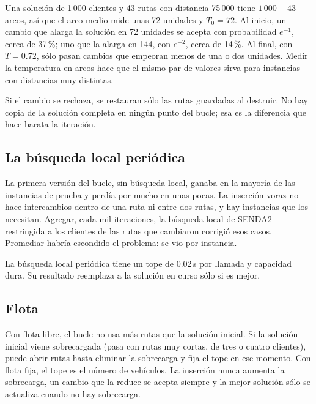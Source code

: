 \documentclass[11pt,a4paper]{article}
\newcommand{\sendados}{SENDA2}
\begin{document}
\begin{ejemplo}
Una solución de 1\,000 clientes y 43 rutas con distancia 75\,000 tiene $1\,000 + 43$ arcos, así que el
arco medio mide unas 72 unidades y $T_0 = 72$. Al inicio, un cambio que alarga la solución en 72
unidades se acepta con probabilidad $e^{-1}$, cerca de 37\,\%; uno que la alarga en 144, con
$e^{-2}$, cerca de 14\,\%. Al final, con $T = 0.72$, sólo pasan cambios que empeoran menos de una o dos
unidades. Medir la temperatura en arcos hace que el mismo par de valores sirva para instancias con
distancias muy distintas.
\end{ejemplo}

Si el cambio se rechaza, se restauran sólo las rutas guardadas al destruir. No hay copia de la solución
completa en ningún punto del bucle; esa es la diferencia que hace barata la iteración.

\subsection{La búsqueda local periódica}

\begin{leccion}
La primera versión del bucle, sin búsqueda local, ganaba en la mayoría de las instancias de prueba y
perdía por mucho en unas pocas. La inserción voraz no hace intercambios dentro de una ruta ni entre dos
rutas, y hay instancias que los necesitan. Agregar, cada mil iteraciones, la búsqueda local de
\sendados{} restringida a los clientes de las rutas que cambiaron corrigió esos casos. Promediar habría
escondido el problema: se vio por instancia.
\end{leccion}

La búsqueda local periódica tiene un tope de 0.02\,s por llamada y capacidad dura. Su resultado
reemplaza a la solución en curso sólo si es mejor.

\subsection{Flota}

Con flota libre, el bucle no usa más rutas que la solución inicial. Si la solución inicial viene
sobrecargada (pasa con rutas muy cortas, de tres o cuatro clientes), puede abrir rutas hasta eliminar
la sobrecarga y fija el tope en ese momento. Con flota fija, el tope es el número de vehículos. La
inserción nunca aumenta la sobrecarga, un cambio que la reduce se acepta siempre y la mejor solución
sólo se actualiza cuando no hay sobrecarga.
\end{document}
